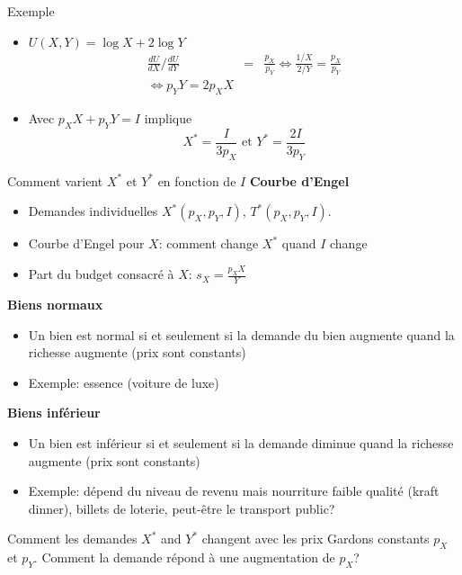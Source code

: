\documentclass[handout]{beamer}
\newenvironment{iPar}[1]{\textbf{#1} \begin{itemize}}{\end{itemize}}
\begin{document}
\begin{frame}{Exemple}
\begin{itemize}
\item $U(X,Y) = \log X +  2\log Y$ \pause
\begin{eqnarray*}\frac{dU}{dX}\Bigg/\frac{dU}{dY} &=& \frac{p_X}{p_Y} \iff \frac{1/X}{2/Y} = \frac{p_X}{p_Y} \\ \iff  p_Y Y = 2p_X X \end{eqnarray*}
\item Avec $p_X X + p_Y Y =  I$ implique $$X^* = \frac{I}{3p_X} \textrm{ et } Y^* = \frac{2I}{3p_Y}$$

\end{itemize}
\end{frame}


\begin{frame}{Comment varient $X^*$ et $Y^*$ en fonction de $I$}
\begin{iPar}{Courbe d'Engel}
\item Demandes individuelles  $X^*(p_X,p_Y,I)$, $T^*(p_X,p_Y,I)$.
\item Courbe d'Engel pour $X$: comment change $X^*$ quand $I$ change
\item Part du budget consacré à $X$: $s_X = \frac{p_X X}{Y}$
\end{iPar} 

\begin{iPar}{Biens normaux}
\item Un bien est normal si et seulement si la demande du bien augmente quand la richesse augmente (prix sont constants)
\item Exemple: essence (voiture de luxe)
\end{iPar}

\begin{iPar}{Biens inférieur}
\item Un bien est inférieur si et seulement si la demande diminue quand la richesse augmente (prix sont constants)
\item Exemple:  dépend du niveau de revenu mais nourriture faible qualité (kraft dinner), billets de loterie, peut-être le transport public?
\end{iPar}

\end{frame}

\begin{frame}{Comment les demandes $X^*$ and $Y^*$ changent avec les prix}
Gardons constants $p_X$ et $p_Y$. Comment la demande répond à une augmentation de $p_X$? 

\end{frame}
\end{document}
